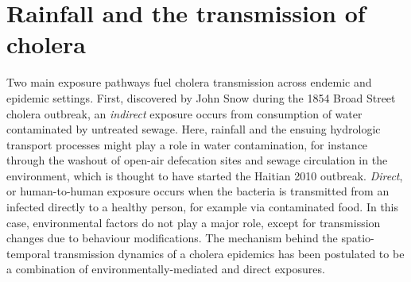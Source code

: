 \section{Rainfall and the transmission of cholera}
Two main exposure pathways fuel cholera transmission across endemic and epidemic settings.
First, discovered by John Snow during the 1854 Broad Street cholera outbreak, an \textit{indirect} exposure occurs from consumption of water contaminated by untreated sewage\cite{Snow:ModeCommunicationCholera:1855}. Here, rainfall and the ensuing hydrologic transport processes might play a role in water contamination, for instance through the washout of open-air defecation sites and sewage circulation in the environment, which is thought to have started the Haitian 2010 outbreak\cite{Piarroux:UnderstandingCholeraEpidemic:2011}.
\textit{Direct}, or human-to-human exposure occurs when the bacteria is transmitted from an infected directly to a healthy person, for example via contaminated food. In this case, environmental factors do not play a major role, except for transmission changes due to behaviour modifications.
The mechanism behind the spatio-temporal transmission dynamics of a cholera epidemics has been postulated to be a combination of environmentally-mediated and direct exposures\cite{Sugimoto:HouseholdTransmissionVibrio:2014,Bi:MicroscaleSpatialClustering:2016,Lessler:MeasuringSpatialDependence:2016,Rinaldo:ModelingKeyDrivers:2017}.
